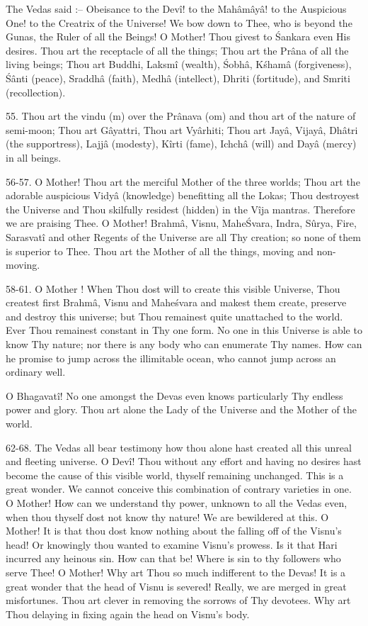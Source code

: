 The Vedas said :-- Obeisance to the Dev\^i! to the Mah\^am\^ay\^a! to the Auspicious One! to the Creatrix of the Universe! We bow down to Thee, who is beyond the Gunas, the Ruler of all the Beings! O Mother! Thou givest to \'Sankara even His desires. Thou art the receptacle of all the things; Thou art the Pr\^ana of all the living beings; Thou art Buddhi, Laksm\^i (wealth), \'Sobh\^a, K\'sham\^a (forgiveness), \'S\^anti (peace), Sraddh\^a (faith), Medh\^a (intellect), Dhriti (fortitude), and Smriti (recollection).

55. Thou art the vindu (m) over the Pr\^anava (om) and thou art of the nature of semi-moon; Thou art G\^ayattri, Thou art Vy\^arhiti; Thou art Jay\^a, Vijay\^a, Dh\^atri (the supportress), Lajj\^a (modesty), K\^irti (fame), Ichch\^a (will) and Day\^a (mercy) in all beings.

56-57. O Mother! Thou art the merciful Mother of the three worlds; Thou art the adorable auspicious Vidy\^a (knowledge) benefitting all the Lokas; Thou destroyest the Universe and Thou skilfully residest (hidden) in the V\^ija mantras. Therefore we are praising Thee. O Mother! Brahm\^a, Visnu, Mahe\'Svara, Indra, S\^urya, Fire, Sarasvat\^i and other Regents of the Universe are all Thy creation; so none of them is superior to Thee. Thou art the Mother of all the things, moving and non-moving.

58-61. O Mother ! When Thou dost will to create this visible Universe, Thou createst first Brahm\^a, Visnu and Mahe\'svara and makest them create, preserve and destroy this universe; but Thou remainest quite unattached to the world. Ever Thou remainest constant in Thy one form. No one in this Universe is able to know Thy nature; nor there is any body who can enumerate Thy names. How can he promise to jump across the illimitable ocean, who cannot jump across an ordinary well.

O Bhagavat\^i! No one amongst the Devas even knows particularly Thy endless power and glory. Thou art alone the Lady of the Universe and the Mother of the world.

62-68. The Vedas all bear testimony how thou alone hast created all this unreal and fleeting universe. O Dev\^i! Thou without any effort and having no desires hast become the cause of this visible world, thyself remaining unchanged. This is a great wonder. We cannot conceive this combination of contrary varieties in one. O Mother! How can we understand thy power, unknown to all the Vedas even, when thou thyself dost not know thy nature! We are bewildered at this. O Mother! It is that thou dost know nothing about the falling off of the Visnu's head! Or knowingly thou wanted to examine Visnu's prowess. Is it that Hari incurred any heinous sin. How can that be! Where is sin to thy followers who serve Thee! O Mother! Why art Thou so much indifferent to the Devas! It is a great wonder that the head of Visnu is severed! Really, we are merged in great misfortunes. Thou art clever in removing the sorrows of Thy devotees. Why art Thou delaying in fixing again the head on Visnu's body.


